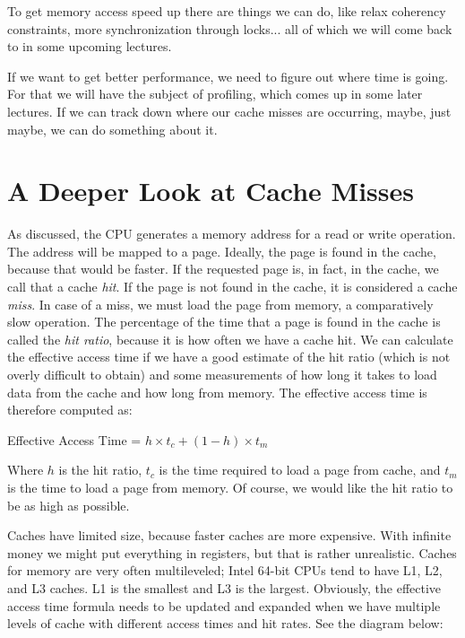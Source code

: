 \documentclass[a4paper]{report}
\begin{document}
To get memory access speed up there are things we can do, like relax coherency constraints, more synchronization through locks... all of which we will come back to in some upcoming lectures. 

If we want to get better performance, we need to figure out where time is going. For that we will have the subject of profiling, which comes up in some later lectures. If we can track down where our cache misses are occurring, maybe, just maybe, we can do something about it. 

\section*{A Deeper Look at Cache Misses}

As discussed, the CPU generates a memory address for a read or write operation. The address will be mapped to a page. Ideally, the page is found in the cache, because that would be faster. If the requested page is, in fact,  in the cache, we call that a cache \textit{hit}. If the page is not found in the cache, it is considered a cache \textit{miss}. In case of a miss, we must load the page from memory, a comparatively slow operation. The percentage of the time that a page is found in the cache is called the \textit{hit ratio}, because it is how often we have a cache hit. We can calculate the effective access time if we have a good estimate of the hit ratio (which is not overly difficult to obtain) and some measurements of how long it takes to load data from the cache and how long from memory. The effective access time is therefore computed as:

\begin{center}
Effective Access Time = $h \times t_{c} + (1-h) \times t_{m}$
\end{center}

Where $h$ is the hit ratio, $t_{c}$ is the time required to load a page from cache, and $t_{m}$ is the time to load a page from memory. Of course, we would like the hit ratio to be as high as possible. 

Caches have limited size, because faster caches are more expensive. With infinite money we might put everything in registers, but that is rather unrealistic. Caches for memory are very often multileveled; Intel 64-bit CPUs tend to have L1, L2, and L3 caches. L1 is the smallest and L3 is the largest. Obviously, the effective access time formula needs to be updated and expanded when we have multiple levels of cache with different access times and hit rates. See the diagram below:
\end{document}
